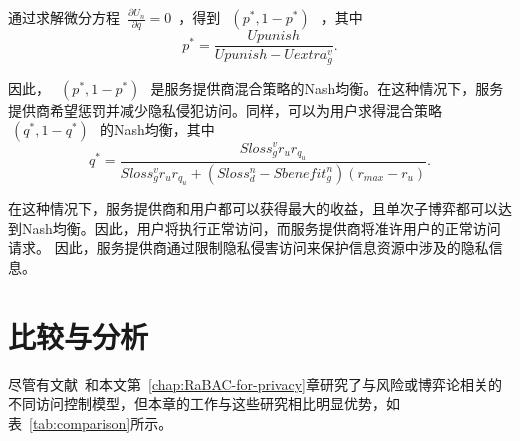 通过求解微分方程~$\frac{\partial U_n}{\partial q}=0$~，得到~$~(p^*,1-p^*)~$~，其中
\begin{equation}
p^*=\dfrac{Upunish}{Upunish-Uextra_g^v}.
\end{equation}

因此，~$~(p^*,1-p^*)~$~是服务提供商混合策略的Nash均衡。在这种情况下，服务提供商希望惩罚并减少隐私侵犯访问。同样，可以为用户求得混合策略~$~(q^*,1-q^*)~$~的Nash均衡，其中
\begin{equation}
q^*=\dfrac{Sloss_g^v r_u r_{q_u}}{Sloss_g^v r_u  r_{q_u} +(Sloss_d^n -Sbenefit_g^n)(r_{max}-r_u)}.
\end{equation}

在这种情况下，服务提供商和用户都可以获得最大的收益，且单次子博弈都可以达到Nash均衡。因此，用户将执行正常访问，而服务提供商将准许用户的正常访问请求。 因此，服务提供商通过限制隐私侵害访问来保护信息资源中涉及的隐私信息。

\section{比较与分析}
\label{sec:comparison}

尽管有文献~\cite{ni2010risk,wang2011quantified,shaikh2012dynamic,santos2016framework,wang2019game,zhang2015towards,zhen2015risk,zhang2018privacy,gao2018game,liu2016dynamic,helil2017non,hu2014game}和本文第~\ref{chap:RaBAC-for-privacy}章研究了与风险或博弈论相关的不同访问控制模型，但本章的工作与这些研究相比明显优势，如表~\ref{tab:comparison}所示。

